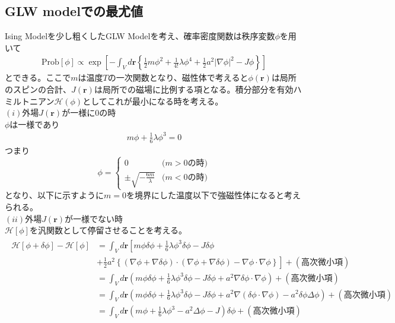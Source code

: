 \documentclass[a4paper,12pt, oneside, openany]{jsbook}
\begin{document}
\subsection{GLW modelでの最尤値}
Ising Modelを少し粗くしたGLW Modelを考え、確率密度関数は秩序変数$\phi$を用いて
\begin{eqnarray}
  \text{Prob}\left[\phi\right]\propto \exp\left[-\int_V d\boldsymbol{r} \left\{\frac{1}{2} m\phi^2 +\frac{1}{4!}\lambda \phi^4+\frac{1}{2} a^2 \left\lvert \nabla  \phi\right\rvert^2-J\phi \right\} \right] 
\end{eqnarray}
とできる。ここで$m$は温度$T$の一次関数となり、磁性体で考えると$\phi(\boldsymbol{r})$は局所のスピンの合計、$J(\boldsymbol{r})$は局所での磁場に比例する項となる。積分部分を有効ハミルトニアン$\mathcal{H} (\phi)$としてこれが最小になる時を考える。\\
$(i)$外場$J(\boldsymbol{r})$が一様に0の時\\
$\phi$は一様であり
\begin{eqnarray}
  m\phi+\frac{1}{6}\lambda \phi^3 = 0
\end{eqnarray}
つまり
\begin{equation}  \label{eq: cases f}
  \phi=
      \begin{cases}
          0  &   \text{($m>0$の時)}  \\
          \pm \sqrt{-\frac{6m}{ \lambda}}      &   \text{($m<0$の時)}
      \end{cases}
  \end{equation}
となり、以下に示すように$m=0$を境界にした温度以下で強磁性体になると考えられる。\\
$(ii)$外場$J(\boldsymbol{r})$が一様でない時\\
$\mathcal{H} \left[\phi\right] $を汎関数として停留させることを考える。
\begin{eqnarray}
\begin{split}
  \mathcal{H} \left[\phi+\delta \phi\right]-\mathcal{H} \left[\phi\right]&=\int_V d \boldsymbol{r} \left[ m\phi \delta \phi +\frac{1}{6}\lambda \phi^3 \delta \phi-J\delta \phi \right.\\
  &\left. +\frac{1}{2} a^2 \left\{(\nabla  \phi+\nabla  \delta \phi)\cdot (\nabla  \phi+\nabla \delta \phi)-\nabla \phi \cdot \nabla \phi \right\} \right] +(高次微小項)\\
  &=\int_V d \boldsymbol{r} \left( m\phi \delta \phi +\frac{1}{6}\lambda \phi^3 \delta \phi-J\delta \phi 
  +a^2 \nabla \delta \phi \cdot \nabla \phi \right) +(高次微小項) \\
  &=\int_V d \boldsymbol{r} \left( m\phi \delta \phi +\frac{1}{6}\lambda \phi^3 \delta \phi-J\delta \phi 
  +a^2 \nabla (\delta \phi \cdot \nabla \phi)-a^2 \delta \phi \Delta \phi \right) +(高次微小項)\\
  &=\int_V d \boldsymbol{r} \left( m\phi +\frac{1}{6}\lambda \phi^3 
  -a^2  \Delta \phi -J \right)\delta \phi +(高次微小項)
\end{split}
\end{eqnarray}
\end{document}
